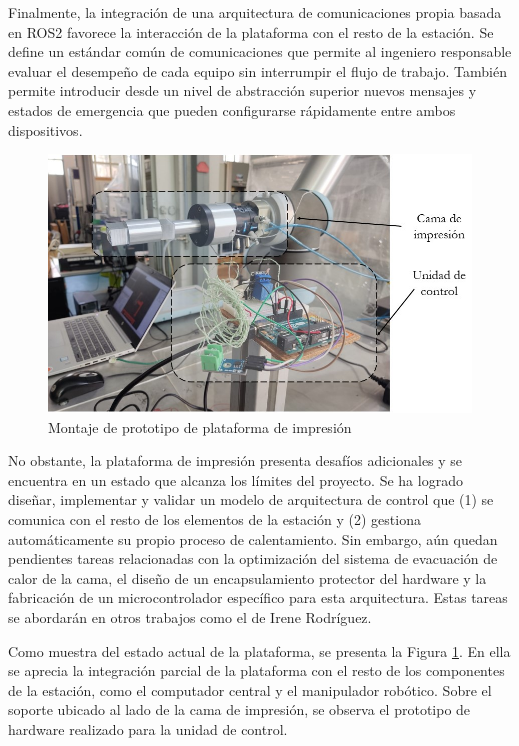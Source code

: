 Finalmente, la integración de una arquitectura de comunicaciones propia basada en ROS2 favorece la interacción de la plataforma con el resto de la estación. Se define un estándar común de comunicaciones que permite al ingeniero responsable evaluar el desempeño de cada equipo sin interrumpir el flujo de trabajo. También permite introducir desde un nivel de abstracción superior nuevos mensajes y estados de emergencia que pueden configurarse rápidamente entre ambos dispositivos.

\begin{figure}[h!]
    \centering
    \includegraphics[scale=0.43]{figuras/Montaje prototipo cama impresion.jpg}
    \caption{Montaje de prototipo de plataforma de impresión}
    \label{fig: montaje prototipo plataforma de impresión}
\end{figure}

No obstante, la plataforma de impresión presenta desafíos adicionales y se encuentra en un estado que alcanza los límites del proyecto. Se ha logrado diseñar, implementar y validar un modelo de arquitectura de control que (1) se comunica con el resto de los elementos de la estación y (2) gestiona automáticamente su propio proceso de calentamiento. Sin embargo, aún quedan pendientes tareas relacionadas con la optimización del sistema de evacuación de calor de la cama, el diseño de un encapsulamiento protector del hardware y la fabricación de un microcontrolador específico para esta arquitectura. Estas tareas se abordarán en otros trabajos como el de Irene Rodríguez.

Como muestra del estado actual de la plataforma, se presenta la Figura \ref{fig: montaje prototipo plataforma de impresión}. En ella se aprecia la integración parcial de la plataforma con el resto de los componentes de la estación, como el computador central y el manipulador robótico. Sobre el soporte ubicado al lado de la cama de impresión, se observa el prototipo de hardware realizado para la unidad de control.


